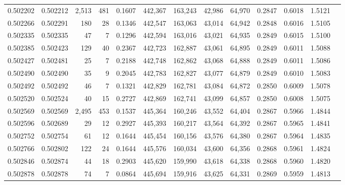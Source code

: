 \begin{tabular}{rrrrrrrrrrrrr}
0.502202 & 0.502212 & 2,513 &   481 &                                     0.1607 & 442,367 & 163,243 &  42,986 &  64,970 & 0.2847 & 0.6018 & 1.5121 \\
0.502266 & 0.502291 &   180 &    28 &                                     0.1346 & 442,547 & 163,063 &  43,014 &  64,942 & 0.2848 & 0.6016 & 1.5105 \\
0.502335 & 0.502335 &    47 &     7 &                                     0.1296 & 442,594 & 163,016 &  43,021 &  64,935 & 0.2849 & 0.6015 & 1.5100 \\
0.502385 & 0.502423 &   129 &    40 &                                     0.2367 & 442,723 & 162,887 &  43,061 &  64,895 & 0.2849 & 0.6011 & 1.5088 \\
0.502427 & 0.502481 &    25 &     7 &                                     0.2188 & 442,748 & 162,862 &  43,068 &  64,888 & 0.2849 & 0.6011 & 1.5086 \\
0.502490 & 0.502490 &    35 &     9 &                                     0.2045 & 442,783 & 162,827 &  43,077 &  64,879 & 0.2849 & 0.6010 & 1.5083 \\
0.502492 & 0.502492 &    46 &     7 &                                     0.1321 & 442,829 & 162,781 &  43,084 &  64,872 & 0.2850 & 0.6009 & 1.5078 \\
0.502520 & 0.502524 &    40 &    15 &                                     0.2727 & 442,869 & 162,741 &  43,099 &  64,857 & 0.2850 & 0.6008 & 1.5075 \\
0.502569 & 0.502569 & 2,495 &   453 &                                     0.1537 & 445,364 & 160,246 &  43,552 &  64,404 & 0.2867 & 0.5966 & 1.4844 \\
0.502596 & 0.502689 &    29 &    12 &                                     0.2927 & 445,393 & 160,217 &  43,564 &  64,392 & 0.2867 & 0.5965 & 1.4841 \\
0.502752 & 0.502754 &    61 &    12 &                                     0.1644 & 445,454 & 160,156 &  43,576 &  64,380 & 0.2867 & 0.5964 & 1.4835 \\
0.502766 & 0.502802 &   122 &    24 &                                     0.1644 & 445,576 & 160,034 &  43,600 &  64,356 & 0.2868 & 0.5961 & 1.4824 \\
0.502846 & 0.502874 &    44 &    18 &                                     0.2903 & 445,620 & 159,990 &  43,618 &  64,338 & 0.2868 & 0.5960 & 1.4820 \\
0.502878 & 0.502878 &    74 &     7 &                                     0.0864 & 445,694 & 159,916 &  43,625 &  64,331 & 0.2869 & 0.5959 & 1.4813 \\

\end{tabular}
